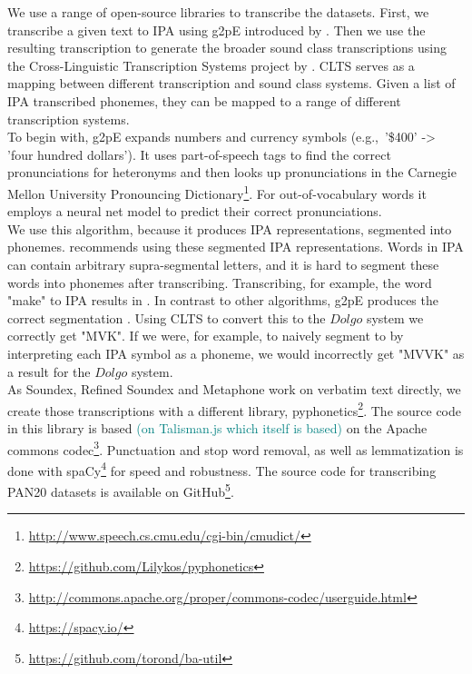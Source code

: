 
We use a range of open-source libraries to transcribe the datasets.
First, we transcribe a given text to IPA using g2pE introduced by \cite{kyubyong2019g2pE}.
Then we use the resulting transcription to generate the broader sound class transcriptions using the Cross-Linguistic Transcription Systems project by \cite{list2018cltsIntro}.
CLTS serves as a mapping between different transcription and sound class systems.
Given a list of IPA transcribed phonemes, they can be mapped to a range of different transcription systems.\\
To begin with, g2pE expands numbers and currency symbols (e.g.,\ '\$400' -> 'four hundred dollars').
It uses part-of-speech tags to find the correct pronunciations for heteronyms and then looks up pronunciations in the Carnegie Mellon University Pronouncing Dictionary\footnote{\url{http://www.speech.cs.cmu.edu/cgi-bin/cmudict/}}.
For out-of-vocabulary words it employs a neural net model to predict their correct pronunciations.\\
We use this algorithm, because it produces IPA representations, segmented into phonemes.
\cite{list2018sequence} recommends using these segmented IPA representations.
Words in IPA can contain arbitrary supra-segmental letters, and it is hard to segment these words into phonemes after transcribing.
Transcribing, for example, the word "make" to IPA results in \textipa{[meIk]}.
In contrast to other algorithms, g2pE produces the correct segmentation \textipa{[m eI k]}.
Using CLTS to convert this to the $Dolgo$ system we correctly get "MVK".
If we were, for example, to naively segment \textipa{[meIk]} to \textipa{[m e I k]} by interpreting each IPA symbol as a phoneme, we would incorrectly get "MVVK" as a result for the $Dolgo$ system.\\
As Soundex, Refined Soundex and Metaphone work on verbatim text directly, we create those transcriptions with a different library, pyphonetics\footnote{\url{https://github.com/Lilykos/pyphonetics}}.
The source code in this library is based \textcolor{teal}{(on Talisman.js which itself is based)} on the Apache commons codec\footnote{\url{http://commons.apache.org/proper/commons-codec/userguide.html}}.
Punctuation and stop word removal, as well as lemmatization is done with spaCy\footnote{\url{https://spacy.io/}} for speed and robustness.
The source code for transcribing PAN20 datasets is available on GitHub\footnote{\url{https://github.com/torond/ba-util}}.

